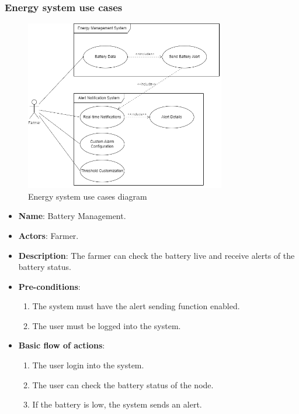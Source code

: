 \subsubsection*{Energy system use cases}
\begin{figure}[H]
    \centering
    \includegraphics[width=0.78\textwidth]{./images/6/energy.png}
    \caption{Energy system use cases diagram}
\end{figure}
\begin{itemize}
    \item \textbf{Name}: Battery Management.
    \item \textbf{Actors}: Farmer.
    \item \textbf{Description}: The farmer can check the battery live and receive alerts of the battery status.
    \item \textbf{Pre-conditions}:
        \begin{enumerate}
            \item The system must have the alert sending function enabled.
            \item The user must be logged into the system.
        \end{enumerate}
    \item \textbf{Basic flow of actions}:
        \begin{enumerate}
            \item The user login into the system.
            \item The user can check the battery status of the node.
            \item If the battery is low, the system sends an alert.
        \end{enumerate}
\end{itemize}

